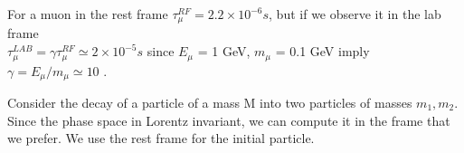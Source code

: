 \documentclass[TheoreticalPhy_ModB.tex]{subfiles}
\begin{document}
\begin{example}
For a muon in the rest frame $\tau_{\mu}^{RF} = 2.2 \times 10^{-6} s$, but if we observe it in the lab frame \\
$\tau_{\mu}^{LAB} = \gamma \tau_{\mu}^{RF} \simeq 2 \times 10^{-5} s$ since $E_{\mu}$ = 1 GeV, $m_{\mu}$ = 0.1 GeV imply
$ \gamma = E_{\mu} / m_{\mu} \simeq 10$ .
\end{example}

\begin{example}[1 $\to$ 2 decay]
Consider the decay of a particle of a mass M into two particles of masses $m_1, m_2$. Since the phase space in Lorentz invariant, we can compute it in the frame that we prefer. We use the rest frame for the initial particle.

\begin{center}

\end{center}


\end{example}
\end{document}
